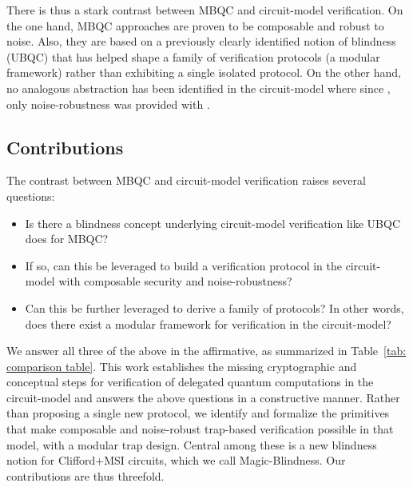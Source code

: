 There is thus a stark contrast between MBQC and circuit-model verification. On the one hand, MBQC approaches are proven to be composable and robust to noise. Also, they are based on a previously clearly identified notion of blindness (UBQC) that has helped shape a family of verification protocols (a modular framework) rather than exhibiting a single isolated protocol.
On the other hand, no analogous abstraction has been identified in the circuit-model where since \cite{B18how}, only noise-robustness was provided with \cite{BN25noise}.

\subsection{Contributions}

The contrast between MBQC and circuit-model verification raises several questions:
\begin{itemize}
    \item Is there a blindness concept underlying circuit-model verification like UBQC does for MBQC?
    \item If so, can this be leveraged to build a verification protocol in the circuit-model with composable security and noise-robustness?
    \item Can this be further leveraged to derive a family of protocols? In other words, does there exist a modular framework for verification in the circuit-model?

\end{itemize}

We answer all three of the above in the affirmative, as summarized in Table~\ref{tab: comparison table}. This work establishes the missing cryptographic and conceptual steps for verification of delegated quantum computations in the circuit-model and answers the above questions in a constructive manner. Rather than proposing a single new protocol, we identify and formalize the primitives that make composable and noise-robust trap-based verification possible in that model, with a modular trap design. Central among these is a new blindness notion for Clifford+MSI circuits, which we call Magic-Blindness. Our contributions are thus threefold.

